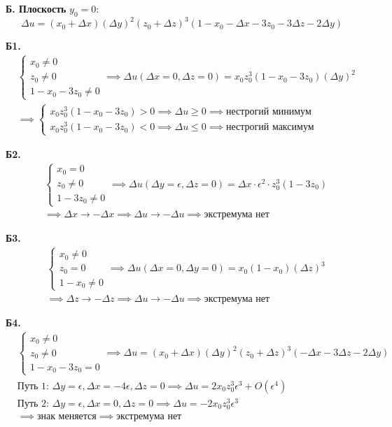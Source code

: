 \documentclass[12pt]{article}
\begin{document}
\vspace{0.5cm}
\noindent \textbf{Б. Плоскость } \(y_0 = 0\):
\[
\Delta u = (x_0+\Delta x)(\Delta y)^2(z_0+\Delta z)^3 (1 - x_0 - \Delta x - 3z_0 - 3\Delta z - 2\Delta y)
\]

\noindent \textbf{Б1.}
\begin{align*}
&\begin{cases} x_0 \neq 0 \\ z_0 \neq 0 \\ 1 - x_0 - 3z_0 \neq 0 \end{cases} \implies \Delta u(\Delta x=0, \Delta z=0) = x_0 z_0^3 (1 - x_0 - 3z_0) (\Delta y)^2 \\
&\implies \begin{cases} x_0 z_0^3 (1 - x_0 - 3z_0) > 0 \implies \Delta u \ge 0 \implies \text{нестрогий минимум} \\ x_0 z_0^3 (1 - x_0 - 3z_0) < 0 \implies \Delta u \le 0 \implies \text{нестрогий максимум} \end{cases}
\end{align*}

\noindent \textbf{Б2.}
\begin{align*}
&\begin{cases} x_0 = 0 \\ z_0 \neq 0 \\ 1 - 3z_0 \neq 0 \end{cases} \implies \Delta u(\Delta y=\epsilon, \Delta z=0) = \Delta x \cdot \epsilon^2 \cdot z_0^3 (1 - 3z_0) \\
&\implies \Delta x \to -\Delta x \implies \Delta u \to -\Delta u \implies \text{экстремума нет}
\end{align*}

\noindent \textbf{Б3.}
\begin{align*}
&\begin{cases} x_0 \neq 0 \\ z_0 = 0 \\ 1 - x_0 \neq 0 \end{cases} \implies \Delta u(\Delta x=0, \Delta y=0) = x_0 (1 - x_0) (\Delta z)^3 \\
&\implies \Delta z \to -\Delta z \implies \Delta u \to -\Delta u \implies \text{экстремума нет}
\end{align*}

\noindent \textbf{Б4.}
\begin{align*}
&\begin{cases} x_0 \neq 0 \\ z_0 \neq 0 \\ 1 - x_0 - 3z_0 = 0 \end{cases} \implies \Delta u = (x_0+\Delta x)(\Delta y)^2(z_0+\Delta z)^3(-\Delta x - 3\Delta z - 2\Delta y) \\
&\text{Путь 1: } \Delta y = \epsilon, \Delta x = -4\epsilon, \Delta z = 0 \implies \Delta u = 2 x_0 z_0^3 \epsilon^3 + O(\epsilon^4) \\
&\text{Путь 2: } \Delta y = \epsilon, \Delta x = 0, \Delta z = 0 \implies \Delta u = -2 x_0 z_0^3 \epsilon^3 \\
&\implies \text{знак меняется} \implies \text{экстремума нет}
\end{align*}
\end{document}
